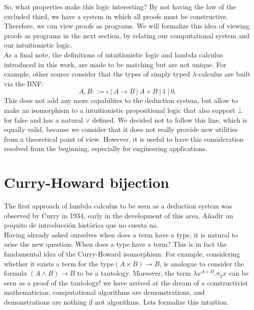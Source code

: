 So, what properties make this logic interesting? By not having the law of the excluded third, we have a system in which all proofs must be constructive. Therefore, we can view proofs as programs. We will formalize this idea of viewing proofs as programs in the next section, by relating our computational system and our intuitionistic logic. \\







As a final note, the definitions of intuitionistic logic and lambda calculus introduced in this work, are made to be matching but are not unique. For example, other source consider that the types of simply typed $\lambda$-calculus are built via the BNF:
  $$A,B ::= \iota\ |\ A\to B\ |\ A \times B \ |\ 1 \ |\ 0 .$$
This does not add any more capabilites to the deduction system, but allow to make an isomorphism to a intuitionistic propositional logic that also support $\bot$ for false and has a natural $\lor$ defined. We decided not to follow this line, which is equally valid, because we consider that it does not really provide new utilities from a theoretical point of view. However, it is useful to have this consideration resolved from the beginning, especially for engineering applications.


\section{Curry-Howard bijection}
The first approach of lambda calculus to be seen as a deduction system was observed by Curry in 1934\cite{curry1934functionality}, early in the development of this area. {\color{red} Añadir un poquito de introducción histórica que no cuesta na.}\\


Having already asked ourselves when does a term have a type, it is natural to arise the new question: When does a type have a term? This is in fact the fundamental idea of the Curry-Howard isomorphism. For example, considering whether it exists a term for the type$(A \times B) \to B$, is analogue to consider the formula $(A\land B)\to B$ to be a tautology. Moreover, the term $\lambda x^{A\times B}. \pi_2 x$ can be seen as a proof of the tautology! we have arrived at the dream of a constructivist mathematician: computational algorithms are demonstrations, and demonstrations are nothing if not algorithms. Lets formalize this intuition.\\


